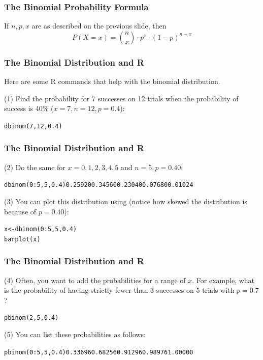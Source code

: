 \documentclass[xcolor=dvipsnames]{beamer}
\begin{document}
\begin{frame}
  \frametitle{The Binomial Probability Formula}
If $n,p,x$ are as described on the previous slide, then
\begin{equation}
  \label{eq:pheehael}
  P(X=x)=\binom{n}{x}\cdot{}p^{x}\cdot(1-p)^{n-x}
\end{equation}
\end{frame}

\begin{frame}
  \frametitle{The Binomial Distribution and R}
Here are some R commands that help with the binomial distribution.

\bigskip

(1) Find the probability for 7 successes on 12 trials when the
probability of success is 40\% ($x=7,n=12,p=0.4$):
\begin{alltt}
  dbinom(7,12,0.4)
\end{alltt}
\end{frame}

\begin{frame}
  \frametitle{The Binomial Distribution and R}
(2) Do the same for $x=0,1,2,3,4,5$ and $n=5,p=0.40$:
\begin{alltt}
  dbinom(0:5,5,0.4) 0.25920 0.34560 0.23040 0.07680 0.01024
\end{alltt}
(3) You can plot this distribution using (notice how skewed the
distribution is because of $p=0.40$):
\begin{alltt}
  x<-dbinom(0:5,5,0.4)\newline
  barplot(x)
\end{alltt}
\end{frame}

\begin{frame}
  \frametitle{The Binomial Distribution and R}
(4) Often, you want to add the probabilities for a range of $x$. For
example, what is the probability of having strictly fewer than 3
successes on 5 trials with $p=0.7$?
\begin{alltt}
  pbinom(2,5,0.4)
\end{alltt}
(5) You can list these probabilities as follows:
\begin{alltt}
  pbinom(0:5,5,0.4) 0.33696 0.68256 0.91296 0.98976 1.00000
\end{alltt}
\end{frame}
\end{document}
